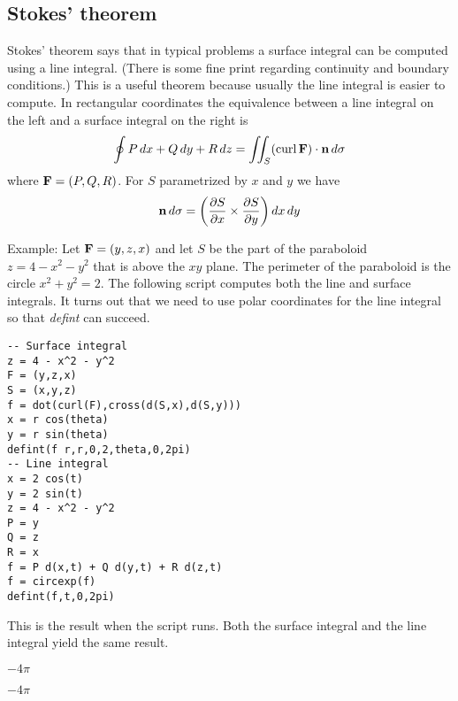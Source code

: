 \subsection{Stokes' theorem}

Stokes' theorem says that in typical problems a surface integral can be
computed using a line integral.
(There is some fine print regarding continuity and boundary conditions.)
This is a useful theorem because usually the line integral is easier to
compute.
In rectangular coordinates the equivalence between a line integral
on the left and a surface integral on the right is
%
$$\oint P\,dx+Q\,dy+R\,dz
=\int\!\!\!\int_S(\mathop{\rm curl}{\bf F})\cdot{\bf n}\,d\sigma
$$
%
where ${\bf F}=(P,Q,R)$.
For $S$ parametrized by $x$ and $y$ we have
$${\bf n}\,d\sigma=\left(
{\partial S\over\partial x}\times{\partial S\over\partial y}
\right)dx\,dy$$

\noindent
Example:
Let ${\bf F}=(y,z,x)$ and let $S$ be the part of the paraboloid
$z=4-x^2-y^2$
that is above the $xy$ plane.
The perimeter of the paraboloid is the circle $x^2+y^2=2$.
The following script computes both the line and surface integrals.
It turns out that we need to use polar coordinates for the
line integral so that {\it defint} can succeed.

\begin{Verbatim}[formatcom=\color{blue},samepage=true]
-- Surface integral
z = 4 - x^2 - y^2
F = (y,z,x)
S = (x,y,z)
f = dot(curl(F),cross(d(S,x),d(S,y)))
x = r cos(theta)
y = r sin(theta)
defint(f r,r,0,2,theta,0,2pi)
-- Line integral
x = 2 cos(t)
y = 2 sin(t)
z = 4 - x^2 - y^2
P = y
Q = z
R = x
f = P d(x,t) + Q d(y,t) + R d(z,t)
f = circexp(f)
defint(f,t,0,2pi)
\end{Verbatim}

\noindent
This is the result when the script runs.
Both the surface integral and the line integral
yield the same result.

\bigskip
\noindent
$\displaystyle -4\pi$

\bigskip
\noindent
$\displaystyle -4\pi$
